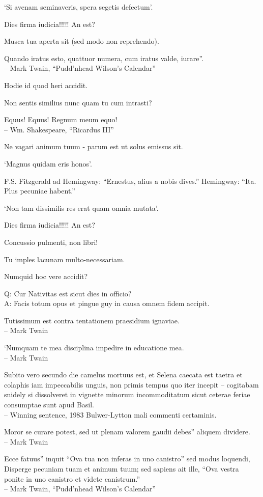 \documentclass[titlepage,12pt]{memoir}
\begin{document}
‘Si avenam seminaveris, spera segetis defectum’.

Dies firma iudicia!!!!! An est?

 Musca tua aperta sit (sed modo non reprehendo).

Quando iratus esto, quattuor numera, cum iratus valde, iurare”.
\\-- Mark Twain, “Pudd’nhead Wilson’s Calendar”

Hodie id quod heri accidit.

Non sentis similius nunc quam tu cum intrasti?

Equus! Equus! Regnum meum equo!
\\-- Wm. Shakespeare, “Ricardus III”

Ne vagari animum tuum - parum est ut solus emissus sit.

‘Magnus quidam eris honos’.

F.S. Fitzgerald ad Hemingway:
“Ernestus, alius a nobis dives.”
Hemingway:
“Ita. Plus pecuniae habent.”

‘Non tam dissimilis res erat quam omnia mutata’.

Dies firma iudicia!!!!! An est?

Concussio pulmenti, non libri!

Tu imples lacunam multo-necessariam.

Numquid hoc vere accidit?

Q: Cur Nativitas est sicut dies in officio?\\
A: Facis totum opus et pingue guy in causa
omnem fidem accipit.

Tutissimum est contra tentationem praesidium ignaviae.
\\-- Mark Twain

‘Numquam te mea disciplina impedire in educatione mea.
\\-- Mark Twain

Subito vero secundo die camelus mortuus est, et Selena caecata est
taetra et colaphis iam impeccabilis unguis, non primis
tempus quo iter incepit -- cogitabam snidely si dissolveret
in vignette minorum incommoditatum sicut ceterae feriae consumptae sunt
apud Basil.
\\-- Winning sentence, 1983 Bulwer-Lytton mali commenti certaminis.

Moror se curare potest, sed ut plenam valorem gaudii debes”
aliquem dividere.
\\-- Mark Twain

Ecce fatuus” inquit “Ova tua non inferas in uno canistro”
sed modus loquendi, Disperge pecuniam tuam et animum tuum; sed sapiens
ait ille, “Ova vestra ponite in uno canistro et videte canistrum.”
\\-- Mark Twain, “Pudd’nhead Wilson’s Calendar”
\end{document}
